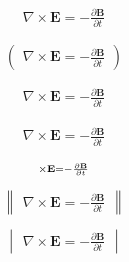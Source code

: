 \documentclass{article}
\begin{document}
\begin{multline*}
\nabla \times \mathbf{E} = - \frac{\partial \mathbf{B}}{\partial t}
\end{multline*}

\[
\begin{pmatrix}
\nabla \times \mathbf{E} = - \frac{\partial \mathbf{B}}{\partial t}
\end{pmatrix}
\]

\[
\begin{smallmatrix}
\nabla \times \mathbf{E} = - \frac{\partial \mathbf{B}}{\partial t}
\end{smallmatrix}
\]

\[
\begin{split}
\nabla \times \mathbf{E} = - \frac{\partial \mathbf{B}}{\partial t}
\end{split}
\]

\[
\begin{subarray}
\nabla \times \mathbf{E} = - \frac{\partial \mathbf{B}}{\partial t}
\end{subarray}
\]

\[
\begin{Vmatrix}
\nabla \times \mathbf{E} = - \frac{\partial \mathbf{B}}{\partial t}
\end{Vmatrix}
\]

\[
\begin{vmatrix}
\nabla \times \mathbf{E} = - \frac{\partial \mathbf{B}}{\partial t}
\end{vmatrix}
\]
\end{document}
